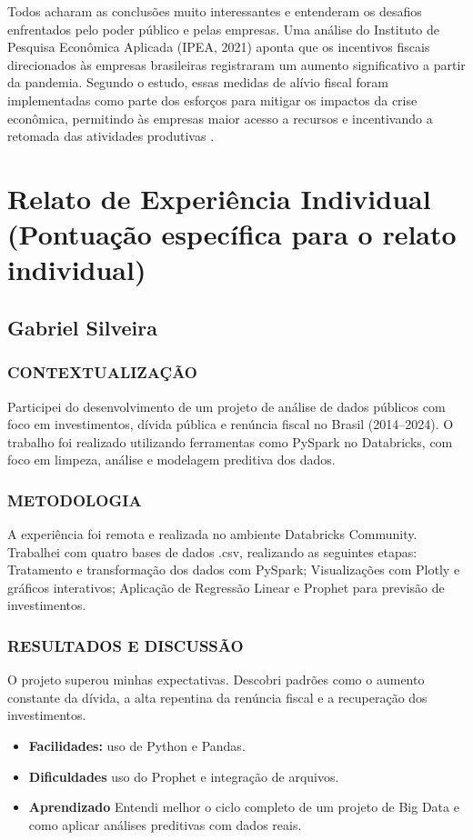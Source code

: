 \documentclass{article}
\begin{document}
Todos acharam as conclusões muito interessantes e entenderam os desafios enfrentados pelo poder público e pelas empresas. Uma análise do Instituto de Pesquisa Econômica Aplicada (IPEA, 2021) aponta que os incentivos fiscais direcionados às empresas brasileiras registraram um aumento significativo a partir da pandemia. Segundo o estudo, essas medidas de alívio fiscal foram implementadas como parte dos esforços para mitigar os impactos da crise econômica, permitindo às empresas maior acesso a recursos e incentivando a retomada das atividades produtivas \cite{IPEA2021}.

\section{Relato de Experiência Individual (Pontuação específica para o relato individual)}

\subsection{Gabriel Silveira}

\subsubsection{CONTEXTUALIZAÇÃO}

Participei do desenvolvimento de um projeto de análise de dados públicos com foco em investimentos, dívida pública e renúncia fiscal no Brasil (2014–2024). O trabalho foi realizado utilizando ferramentas como PySpark no Databricks, com foco em limpeza, análise e modelagem preditiva dos dados.

\subsubsection{METODOLOGIA}
A experiência foi remota e realizada no ambiente Databricks Community. Trabalhei com quatro bases de dados .csv, realizando as seguintes etapas:
Tratamento e transformação dos dados com PySpark;
Visualizações com Plotly e gráficos interativos;
Aplicação de Regressão Linear e Prophet para previsão de investimentos.

\subsubsection{RESULTADOS E DISCUSSÃO}
O projeto superou minhas expectativas. Descobri padrões como o aumento constante da dívida, a alta repentina da renúncia fiscal e a recuperação dos investimentos.
    \begin{itemize}
        \item \textbf{Facilidades:} uso de Python e Pandas.
        \item \textbf{Dificuldades} uso do Prophet e integração de arquivos.
        \item \textbf{Aprendizado} Entendi melhor o ciclo completo de um projeto de Big Data e como aplicar análises preditivas com dados reais.
    \end{itemize}
\end{document}
